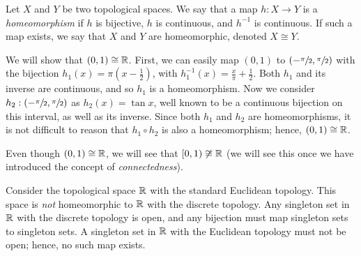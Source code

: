 

\begin{definition}[Homeomorphism]
	Let $X$ and $Y$ be two topological spaces.
	We say that a map $h: X \to Y$ is a \emph{homeomorphism} if $h$ is
	bijective, $h$ is continuous, and $h^{-1}$ is continuous.
	If such a map exists, we say that $X$ and $Y$ are homeomorphic, denoted
	$X \cong Y$.
\end{definition}

\begin{example}[]
	We will show that $(0,1) \cong \mathbb{R}$.
	First, we can easily map $(0,1)$ to $(-\sfrac{\pi}2, \sfrac{\pi}2)$ with the
	bijection $h_1(x) = \pi \left( x - \frac12 \right)$, with
	$h_1^{-1}(x) = \frac{x}{\pi} + \frac12$.
	Both $h_1$ and its inverse are continuous, and so $h_1$ is a homeomorphism.
	Now we consider $h_2: (-\sfrac{\pi}2, \sfrac{\pi}2)$ as $h_2(x) = \tan{x}$,
	well known to be a continuous bijection on this interval, as well as its
	inverse.
	Since both $h_1$ and $h_2$ are homeomorphisms, it is not difficult to reason
	that $h_1 \circ h_2$ is also a homeomorphism; hence, $(0,1) \cong \mathbb{R}$.
\end{example}

Even though $(0,1) \cong \mathbb{R}$, we will see that $[0,1) \not\cong \mathbb{R}$ (we will
see this once we have introduced the concept of \emph{connectedness}).

\begin{example}[]
	Consider the topological space $\mathbb{R}$ with the standard Euclidean topology.
	This space is \emph{not} homeomorphic to $\mathbb{R}$ with the discrete topology.
	Any singleton set in $\mathbb{R}$ with the discrete topology is open, and any
	bijection must map singleton sets to singleton sets. A singleton set in $\mathbb{R}$
	with the Euclidean topology must not be open; hence, no such map exists.
\end{example}

